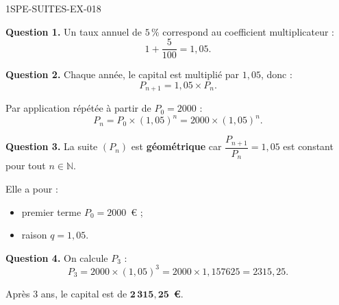 \begin{corrige}{1SPE-SUITES-EX-018}


\textbf{Question 1.} Un taux annuel de $5\,\%$ correspond au coefficient multiplicateur :
\[
1 + \frac{5}{100} = 1{,}05.
\]


\textbf{Question 2.} Chaque année, le capital est multiplié par $1{,}05$, donc :
\[
P_{n+1} = 1{,}05 \times P_n.
\]

Par application répétée à partir de $P_0 = 2000$ :
\[
P_n = P_0 \times (1{,}05)^n = 2000 \times (1{,}05)^n.
\]

\textbf{Question 3.} La suite $(P_n)$ est \textbf{géométrique} car $\dfrac{P_{n+1}}{P_n} = 1{,}05$ est constant pour tout $n \in \mathbb{N}$.

Elle a pour :
\begin{itemize}
  \item premier terme $P_0 = 2000$~€ ;
  \item raison $q = 1{,}05$.
\end{itemize}


\textbf{Question 4.} On calcule $P_3$ :
\[
P_3 = 2000 \times (1{,}05)^3 = 2000 \times 1{,}157625 = 2315{,}25.
\]

Après $3$ ans, le capital est de $\mathbf{2\,315{,}25}$~\textbf{€}.

\end{corrige}
